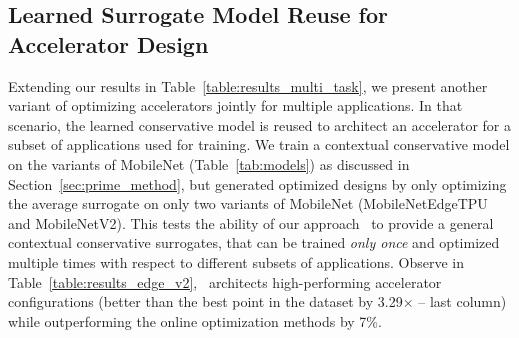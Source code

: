 \subsection{Learned Surrogate Model Reuse for Accelerator Design}
\label{app:additional_experiments_multi}
%
Extending our results in Table~\ref{table:results_multi_task}, we present another variant of optimizing accelerators jointly for multiple applications. In that scenario, the learned conservative model is reused to architect an accelerator for a subset of applications used for training. We train a contextual conservative model on the variants of MobileNet (Table~\ref{tab:models}) as discussed in Section~\ref{sec:prime_method}, but generated optimized designs by only optimizing the average surrogate on only two variants of MobileNet (MobileNetEdgeTPU and MobileNetV2). This tests the ability of our approach \primemethodname\ to provide a general contextual conservative surrogates, that can be trained \textit{only once} and optimized multiple times with respect to different subsets of applications. Observe in Table~\ref{table:results_edge_v2}, \primemethodname\ architects high-performing accelerator configurations (better than the best point in the dataset by 3.29$\times$ -- last column) while outperforming the online optimization methods by 7\%.
%
\begin{table}[t!]
\small
\renewcommand{\arraystretch}{1.2}
\centering
\caption{Optimized objective values (i.e., latency in milliseconds) obtained by our \primemethodname\ when using the jointly optimized model on three variants of MobileNets and use for MobileNetEdgeTPU and MobileNetV2 for different dataset configurations. \primemethodname\ outperforms the best online method by \textbf{7\%} and finds an accelerator that is \textbf{3.29$\times$} better than the best accelerator in the training dataset (last row). The best accelerator configuration is highlighted in bold.}
\label{table:results_edge_v2}
\end{table}



